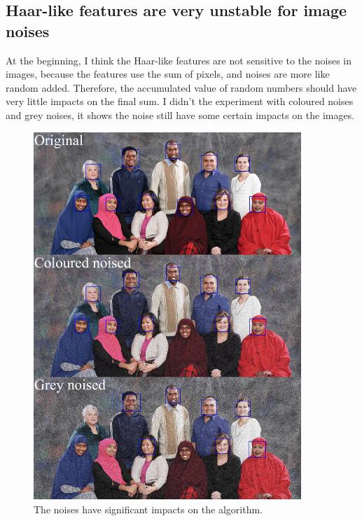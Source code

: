 \documentclass[10pt,twocolumn,letterpaper]{article}
\begin{document}
\subsection{Haar-like features are very unstable for image noises}
At the beginning, I think the Haar-like features are not sensitive to the noises in images,
because the features use the sum of pixels, and noises are more like random added.
Therefore, the accumulated value of random numbers should have very little impacts on the final sum.
I didn't the experiment with coloured noises and grey noises, it shows the noise still have some certain impacts on the images.

\begin{figure}
    \begin{center}
        \includegraphics[width=0.9\textwidth]{11people-noised}
    \end{center}
    \caption{The noises \cite{noise} have significant impacts \cite{skinface} on the algorithm.}
    \label{fig:tiltcor}
\end{figure}
\end{document}
